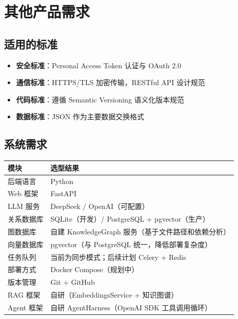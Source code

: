 \documentclass[10pt,a4paper]{article}
\newenvironment{ieeetable}{\begin{center}}{\end{center}}
\begin{document}
\section{其他产品需求}

\subsection{适用的标准}

\begin{itemize}
    \item \textbf{安全标准}：Personal Access Token 认证与 OAuth 2.0
    \item \textbf{通信标准}：HTTPS/TLS 加密传输，RESTful API 设计规范
    \item \textbf{代码标准}：遵循 Semantic Versioning 语义化版本规范
    \item \textbf{数据标准}：JSON 作为主要数据交换格式
\end{itemize}

\subsection{系统需求}

\begin{ieeetable}
    \begin{tabularx}{\textwidth}{L{3.5cm} X}
        \toprule
        \textbf{模块} & \textbf{选型结果} \\
        \midrule
        后端语言 & Python \\
        \midrule
        Web 框架 & FastAPI \\
        \midrule
        LLM 服务 & DeepSeek / OpenAI（可配置） \\
        \midrule
        关系数据库 & SQLite（开发）/ PostgreSQL + pgvector（生产） \\
        \midrule
        图数据库 & 自建 KnowledgeGraph 服务（基于文件路径和依赖分析） \\
        \midrule
        向量数据库 & pgvector（与 PostgreSQL 统一，降低部署复杂度） \\
        \midrule
        任务队列 & 当前为同步模式；后续计划 Celery + Redis \\
        \midrule
        部署方式 & Docker Compose（规划中） \\
        \midrule
        版本管理 & Git + GitHub \\
        \midrule
        RAG 框架 & 自研（EmbeddingsService + 知识图谱） \\
        \midrule
        Agent 框架 & 自研 AgentHarness（OpenAI SDK 工具调用循环） \\
        \bottomrule
    \end{tabularx}
\end{ieeetable}
\end{document}
